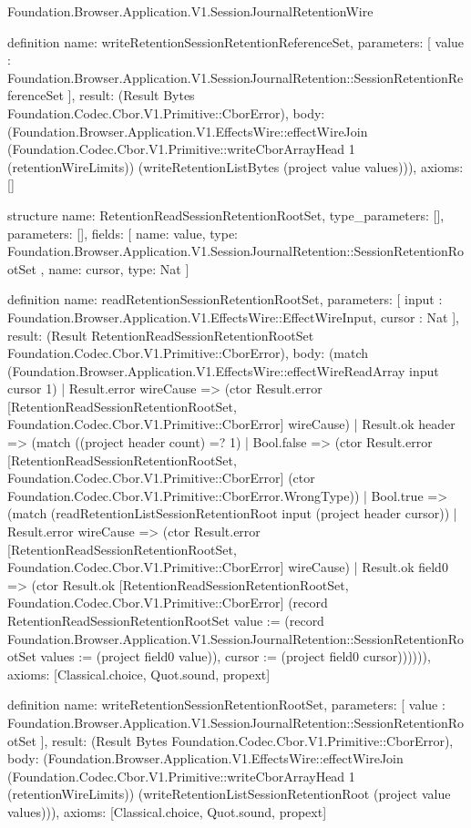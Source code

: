 \begin{lexlean}{Foundation.Browser.Application.V1.SessionJournalRetentionWire}
\begin{semanticmodule}
definition{
  name: writeRetentionSessionRetentionReferenceSet,
  parameters: [
    value : Foundation.Browser.Application.V1.SessionJournalRetention::SessionRetentionReferenceSet
  ],
  result: (Result Bytes Foundation.Codec.Cbor.V1.Primitive::CborError),
  body: (Foundation.Browser.Application.V1.EffectsWire::effectWireJoin (Foundation.Codec.Cbor.V1.Primitive::writeCborArrayHead 1 (retentionWireLimits)) (writeRetentionListBytes (project value values))),
  axioms: []
}

structure{
  name: RetentionReadSessionRetentionRootSet,
  type_parameters: [],
  parameters: [],
  fields: [
    {
      name: value,
      type: Foundation.Browser.Application.V1.SessionJournalRetention::SessionRetentionRootSet
    },
    {name: cursor, type: Nat}
  ]
}

definition{
  name: readRetentionSessionRetentionRootSet,
  parameters: [
    input : Foundation.Browser.Application.V1.EffectsWire::EffectWireInput,
    cursor : Nat
  ],
  result: (Result RetentionReadSessionRetentionRootSet Foundation.Codec.Cbor.V1.Primitive::CborError),
  body: (match (Foundation.Browser.Application.V1.EffectsWire::effectWireReadArray input cursor 1)
    | Result.error wireCause => (ctor Result.error [RetentionReadSessionRetentionRootSet, Foundation.Codec.Cbor.V1.Primitive::CborError] wireCause)
    | Result.ok header => (match ((project header count) =? 1)
      | Bool.false => (ctor Result.error [RetentionReadSessionRetentionRootSet, Foundation.Codec.Cbor.V1.Primitive::CborError] (ctor Foundation.Codec.Cbor.V1.Primitive::CborError.WrongType))
      | Bool.true => (match (readRetentionListSessionRetentionRoot input (project header cursor))
        | Result.error wireCause => (ctor Result.error [RetentionReadSessionRetentionRootSet, Foundation.Codec.Cbor.V1.Primitive::CborError] wireCause)
        | Result.ok field0 => (ctor Result.ok [RetentionReadSessionRetentionRootSet, Foundation.Codec.Cbor.V1.Primitive::CborError] (record RetentionReadSessionRetentionRootSet {value := (record Foundation.Browser.Application.V1.SessionJournalRetention::SessionRetentionRootSet {values := (project field0 value)}), cursor := (project field0 cursor)}))))),
  axioms: [Classical.choice, Quot.sound, propext]
}

definition{
  name: writeRetentionSessionRetentionRootSet,
  parameters: [
    value : Foundation.Browser.Application.V1.SessionJournalRetention::SessionRetentionRootSet
  ],
  result: (Result Bytes Foundation.Codec.Cbor.V1.Primitive::CborError),
  body: (Foundation.Browser.Application.V1.EffectsWire::effectWireJoin (Foundation.Codec.Cbor.V1.Primitive::writeCborArrayHead 1 (retentionWireLimits)) (writeRetentionListSessionRetentionRoot (project value values))),
  axioms: [Classical.choice, Quot.sound, propext]
}


\end{semanticmodule}
\end{lexlean}
